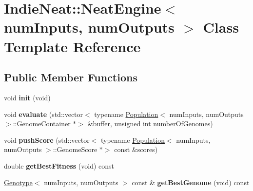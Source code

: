 \hypertarget{class_indie_neat_1_1_neat_engine}{}\section{Indie\+Neat\+:\+:Neat\+Engine$<$ num\+Inputs, num\+Outputs $>$ Class Template Reference}
\label{class_indie_neat_1_1_neat_engine}
\subsection*{Public Member Functions}
\begin{DoxyCompactItemize}
\item 
\mbox{\label{class_indie_neat_1_1_neat_engine_a5d76888dd3cea3a462af394483f1cc6e}} 
void {\bfseries init} (void)
\item 
\mbox{\label{class_indie_neat_1_1_neat_engine_abd2f03a971452369f1bfe12898911ce8}} 
void {\bfseries evaluate} (std\+::vector$<$ typename \hyperlink{class_indie_neat_1_1_population}{Population}$<$ num\+Inputs, num\+Outputs $>$\+::Genome\+Container $\ast$$>$ \&buffer, unsigned int number\+Of\+Genomes)
\item 
\mbox{\label{class_indie_neat_1_1_neat_engine_a76332206d1a2a5bc57142f4175bee100}} 
void {\bfseries push\+Score} (std\+::vector$<$ typename \hyperlink{class_indie_neat_1_1_population}{Population}$<$ num\+Inputs, num\+Outputs $>$\+::Genome\+Score $\ast$$>$ const \&scores)
\item 
\mbox{\label{class_indie_neat_1_1_neat_engine_a34cb78a2be59c9d8a35b0abe2cf4910d}} 
double {\bfseries get\+Best\+Fitness} (void) const
\item 
\mbox{\label{class_indie_neat_1_1_neat_engine_a3b75e3f1146a21e017dfc06d9bfd0d42}} 
\hyperlink{class_indie_neat_1_1_genotype}{Genotype}$<$ num\+Inputs, num\+Outputs $>$ const  \& {\bfseries get\+Best\+Genome} (void) const
\item 
\mbox{\label{class_indie_neat_1_1_neat_engine_a9e61d72e52fbffca74e52ab84d99b4cb}} 

\end{DoxyCompactItemize}
